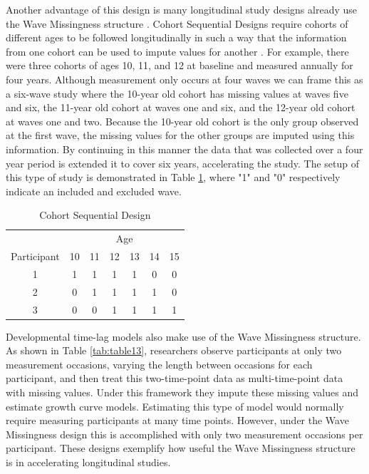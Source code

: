 \documentclass{svjour3}\usepackage[]{graphicx}\usepackage[]{color}
\begin{document}
Another advantage of this design is many longitudinal study designs already use the Wave Missingness structure \citep{little2013planned}. Cohort Sequential Designs require cohorts of different ages to be followed longitudinally in such a way that the information from one cohort can be used to impute values for another \citep{little2013longitudinal, duncan2013introduction}. For example, there were three cohorts of ages 10, 11, and 12 at baseline and measured annually for four years. Although measurement only occurs at four waves we can frame this as a six-wave study where the 10-year old cohort has missing values at waves five and six, the 11-year old cohort at waves one and six, and the 12-year old cohort at waves one and two. Because the 10-year old cohort is the only group observed at the first wave, the missing values for the other groups are imputed using this information. By continuing in this manner the data that was collected over a four year period is extended it to cover six years, accelerating the study. The setup of this type of study is demonstrated in Table \ref{tab:table12}, where "1" and "0" respectively indicate an included and excluded wave. \par

\begin{table}[t!]
	\centering
	\caption{Cohort Sequential Design}
	\label{tab:table12}
	\setlength{\tabcolsep}{0.5cm}
	\begin{tabular}{c|cccccc}
		\toprule
		& \multicolumn{6}{c}{Age} \\
		Participant & 10 & 11 & 12 & 13 & 14 & 15 \\
		\midrule
		1 & 1 & 1 & 1 & 1 & 0 & 0\\
		2 & 0 & 1 & 1 & 1 & 1 & 0\\
		3 & 0 & 0 & 1 & 1 & 1 & 1\\
		\bottomrule
	\end{tabular}
\end{table}

Developmental time-lag models \citep{mcardle1997expanding} also make use of the Wave Missingness structure. As shown in Table \ref{tab:table13}, researchers observe participants at only two measurement occasions, varying the length between occasions for each participant, and then treat this two-time-point data as multi-time-point data with missing values. Under this framework they impute these missing values and estimate growth curve models. Estimating this type of model would normally require measuring participants at many time points. However, under the Wave Missingness design this is accomplished with only two measurement occasions per participant. These designs exemplify how useful the Wave Missingness structure is in accelerating longitudinal studies. \par
\end{document}

